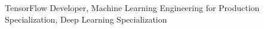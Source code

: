 
\cventry
    {} %
    {} %
    {} %
    {} %
    {
    {TensorFlow Developer, Machine Learning Engineering for Production Specialization, Deep Learning Specialization}
    }


